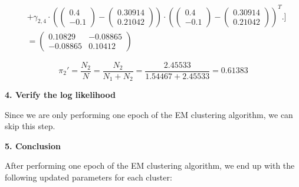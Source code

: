 \documentclass[12pt]{article}
\begin{document}
\begin{enumerate}[leftmargin=\labelsep]
\begin{align*}
                    & + \gamma_{2,4} \cdot \left(\begin{pmatrix} 0.4 \\ -0.1 \end{pmatrix} - \begin{pmatrix} 0.30914 \\ 0.21042 \end{pmatrix}\right) \cdot \left(\begin{pmatrix} 0.4 \\ -0.1 \end{pmatrix} - \begin{pmatrix} 0.30914 \\ 0.21042 \end{pmatrix}\right)^T
          \Bigg. \Bigg]                                                                                                                                                                                                                                                \\
                    & = \begin{pmatrix} 0.10829 & -0.08865 \\ -0.08865 & 0.10412 \end{pmatrix}
        \end{align*}
        \endgroup

        \begin{equation*}
          \pi_2' = \frac{N_2}{N} = \frac{N_2}{N_1 + N_2} = \frac{2.45533}{1.54467 + 2.45533} = 0.61383
        \end{equation*}

        \vskip 0.2cm
          {
            \color{stepscolor}
            \begin{large}\textbf{4. Verify the log likelihood}\end{large}
            \vskip 0.1cm
          }

        Since we are only performing one epoch of the EM clustering algorithm, we can skip this step.

        \vskip 0.2cm
          {
            \color{stepscolor}
            \begin{large}\textbf{5. Conclusion}\end{large}
            \vskip 0.1cm
          }

        After performing one epoch of the EM clustering algorithm, we end up with the following updated parameters for each cluster:


\end{enumerate}
\end{document}
